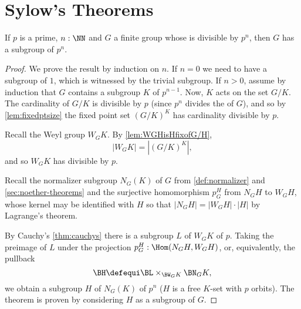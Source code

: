\section{Sylow's Theorems}
\label{sec:sylow}
\begin{theorem}
  \label{thm:sylow1}
  If $p$ is a prime, $n:\NN$ and $G$ a finite group whose \gporder is divisible by $p^n$, then $G$ has a subgroup of \gporder $p^n$.
\end{theorem}
\begin{proof}
  We prove the result by induction on $n$.
If $n=0$ we need to have a subgroup of \gporder $1$, which is witnessed by the trivial subgroup.
If $n>0$, assume by induction that $G$ contains a subgroup $K$ of \gporder $p^{n-1}$.
Now, $K$ acts on the set $G/K$.
The cardinality of $G/K$ is divisible by $p$ (since $p^n$ divides the \gporder of $G$), and so by \cref{lem:fixedptsize} the fixed point set $(G/K)^K$ has cardinality divisible by $p$.

Recall the Weyl group $W_GK$.
By \cref{lem:WGHisHfixofG/H},
$$|W_GK|=|(G/K)^K|,$$
 and so $W_GK$  has \gporder divisible by $p$.

Recall the normalizer subgroup $N_G(K)$ of $G$ from \cref{def:normalizer} and \cref{sec:noether-theorems} %
and the surjective homomorphism $p_G^H$ from $N_GH$ to $W_GH$, %
whose kernel may be identified with $H$ so that $|N_GH|=|W_GH|\cdot|H|$ by Lagrange's theorem.


By Cauchy's \cref{thm:cauchys} there is a subgroup $L$ of $W_GK$ of \gporder $p$.
Taking the preimage of $L$ under the projection $p_G^H:\Hom(N_GH,W_GH)$, %
or, equivalently, the pullback
$$\BH\defequi \BL\times_{\BW_GK}\BN_GK,$$
we obtain a subgroup $H$ of $N_G(K)$ of \gporder $p^n$ ($H$ is a free $K$-set with $p$ orbits).  The theorem is proven by considering $H$ as a subgroup of $G$.
\end{proof}
